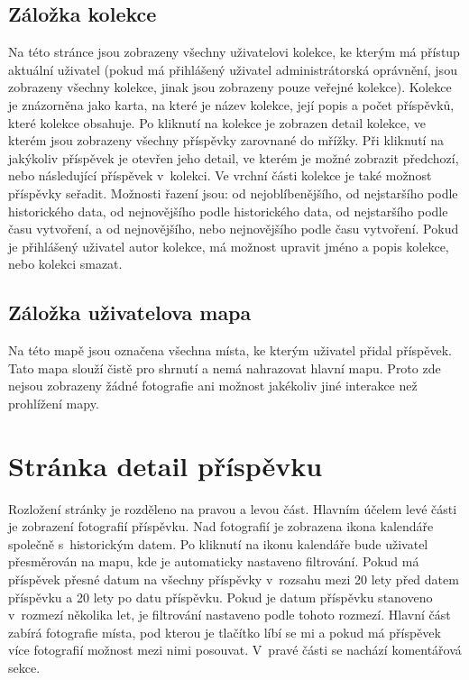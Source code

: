 \documentclass[12pt, a4paper,
  oneside,      %
]{report}
\begin{document}
\subsection{Záložka kolekce}
Na této stránce jsou zobrazeny všechny uživatelovi kolekce, ke kterým má přístup aktuální uživatel (pokud má přihlášený uživatel administrátorská oprávnění, jsou zobrazeny všechny kolekce, jinak jsou zobrazeny pouze veřejné kolekce). Kolekce je znázorněna jako karta, na které je název kolekce, její popis a počet příspěvků, které kolekce obsahuje. Po kliknutí na kolekce je zobrazen detail kolekce, ve kterém jsou zobrazeny všechny příspěvky zarovnané do mřížky. Při kliknutí na jakýkoliv příspěvek je otevřen jeho detail, ve kterém je možné zobrazit předchozí, nebo následující příspěvek v~kolekci. Ve vrchní části kolekce je také možnost příspěvky seřadit. Možnosti řazení jsou: od nejoblíbenějšího, od nejstaršího podle historického data, od nejnovějšího podle historického data, od nejstaršího podle času vytvoření, a od nejnovějšího, nebo nejnovějšího podle času vytvoření. Pokud je přihlášený uživatel autor kolekce, má možnost upravit jméno a popis kolekce, nebo kolekci smazat.
\subsection{Záložka uživatelova mapa}
Na této mapě jsou označena všechna místa, ke kterým uživatel přidal příspěvek. Tato mapa slouží čistě pro shrnutí a nemá nahrazovat hlavní mapu. Proto zde nejsou zobrazeny žádné fotografie ani možnost jakékoliv jiné interakce než prohlížení mapy.

\section{Stránka detail příspěvku}
Rozložení stránky je rozděleno na pravou a levou část. Hlavním účelem levé části je zobrazení fotografií příspěvku. Nad fotografií je zobrazena ikona kalendáře společně s~historickým datem. Po kliknutí na ikonu kalendáře bude uživatel přesměrován na mapu, kde je automaticky nastaveno filtrování. Pokud má příspěvek přesné datum na všechny příspěvky v~rozsahu mezi 20 lety před datem příspěvku a 20 lety po datu příspěvku. Pokud je datum příspěvku stanoveno v~rozmezí několika let, je filtrování nastaveno podle tohoto rozmezí. Hlavní část zabírá fotografie místa, pod kterou je tlačítko líbí se mi a pokud má příspěvek více fotografií možnost mezi nimi posouvat. V~pravé části se nachází komentářová sekce.
\end{document}

